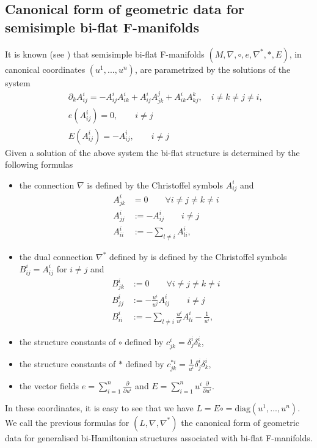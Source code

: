 \documentclass[11pt,a4paper]{amsart}
\numberwithin{equation}{section}
\def\d{\partial}
\def\f{\frac}
\numberwithin{equation}{section}
\begin{document}
\subsection{Canonical form of geometric data for semisimple bi-flat F-manifolds}   
It is known (see \cite{ALmulti}) that semisimple bi-flat F-manifolds $(M,\nabla,\circ,e,\nabla^*,*,E)$, 
 in canonical  coordinates $(u^1,...,u^n)$,  are parametrized by the solutions of the system
\begin{eqnarray*}
&&\d_kA^i_{ij}=-A^i_{ij}A^i_{ik}+A^i_{ij}A^j_{jk}
+A^i_{ik}A^k_{kj}, \quad i\ne k\ne j\ne i,\\
&&e(A^i_{ij})=0,\qquad i\ne j\\
&&E(A^i_{ij})=-A^i_{ij},\qquad i\ne  j
\end{eqnarray*}
Given a solution of the above system the bi-flat structure is determined by the following formulas
\begin{itemize}
\item the connection $\nabla$ is defined by the Christoffel symbols $A^i_{ij}$ and
\begin{equation*}\label{naturalc}
\begin{split}
A^i_{jk}&=0\qquad\forall i\ne j\ne k \ne i\\
A^i_{jj}&:=-A^i_{ij}\qquad i\ne j\\
A^i_{ii}&:=-\sum_{l\ne i}A^i_{li},
\end{split}
\end{equation*} 
\item the dual connection $\nabla^*$ defined by is defined by the Christoffel symbols $B^i_{ij}=A^i_{ij}$ for $i\neq j$ and
\begin{equation*}\label{dualnabla}
\begin{split}
B^i_{jk}&:=0\qquad\forall i\ne j\ne k \ne i\\
B^i_{jj}&:=-\f{u^i}{u^j}A^i_{ij}\qquad i\ne j\\
B^i_{ii}&:=-\sum_{l\ne i}\f{u^l}{u^i}A^i_{li}-\f{1}{u^i},
\end{split}
\end{equation*}
\item the structure constants of  $\circ$ defined by $c^i_{jk}=\delta^i_j\delta^i_k$,
\item the structure constants  of $*$ defined by $c^{*i}_{jk}=\f{1}{u^i}\delta^i_j\delta^i_k$, 
\item the vector fields $e=\sum_{i=1}^n\frac{\partial}{\partial u^i}$ and $E=\sum_{i=1}^nu^i\frac{\partial}{\partial u^i}$. 
\end{itemize} 
In these coordinates, it is easy to see that we have $L=E\circ=\text{diag}(u^1,...,u^n)$.
\newline
\newline
We call the previous formulas for $(L,\nabla,\nabla^*)$ the canonical form of geometric data for generalised bi-Hamiltonian structures associated with bi-flat F-manifolds.
\end{document}
